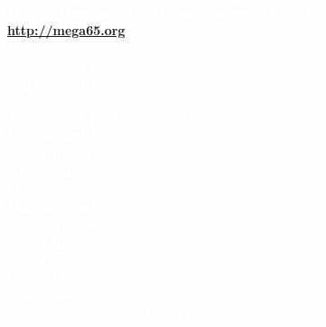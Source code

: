 \def\printmanual{true}








\cleardoublepage
{}








\appendix
\begin{appendices}
  
  
  
  
  
  
  
\end{appendices}

\printindex


\begin{center}

\textbf{\large\textcolor{white}{MEGA Museum of Electronic Games \& Art e.V. \\
\vspace{3mm}
\url{http://mega65.org}}}\\
\vspace{6mm}
\textbf{\large\textcolor{white}{
Editors:\\
\vspace{2mm}
Assoc. Prof. Paul Gardner-Stephen\\
Dr. Edilbert Kirk\\
\vspace{6mm}
Authors: \\
\vspace{2mm}
Assoc. Prof. Paul Gardner-Stephen\\
Dr. Edilbert Kirk\\
Detlef Hastik\\
Gürçe Işıkyıldız\\
Stephan Kleinert\\
Maurice van Gils\\
Wayne Johnson\\
Daren Klamer\\
Jim Nicholls\\
Oliver Graf\\
Dan Sanderson\\
\vspace{6mm}
and many other contributors\\
}}
\vspace{4.1cm}
\colorbox{white}{\EANisbn[ISBN=978-0-6452968-1-5,SC4]}
\end{center}



